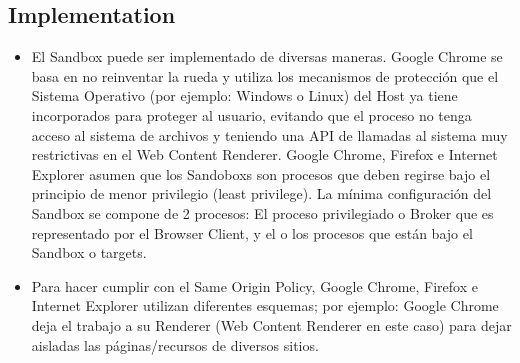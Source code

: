 \documentclass{sig-alternate-05-2015}
\begin{document}
  \subsection*{Implementation}
  \begin{itemize}
    \item El Sandbox puede ser implementado de diversas maneras. Google Chrome \cite{sandboxGC} se basa en no reinventar la rueda y utiliza los mecanismos de protección que el Sistema Operativo (por ejemplo: Windows o Linux) del Host ya tiene incorporados para proteger al usuario, evitando que el proceso no tenga acceso al sistema de archivos y teniendo una API de llamadas al sistema muy restrictivas en el Web Content Renderer. Google Chrome, Firefox e Internet Explorer asumen que los Sandoboxs son procesos que deben regirse bajo el principio de menor privilegio (least privilege). La mínima configuración del Sandbox se compone de 2 procesos: El proceso privilegiado o Broker que es representado por el Browser Client, y el o los procesos que están bajo el Sandbox o targets.
    \item Para hacer cumplir con el Same Origin Policy, Google Chrome, Firefox e Internet Explorer utilizan diferentes esquemas; por ejemplo: Google Chrome deja el trabajo a su Renderer (Web Content Renderer en este caso) para dejar aisladas las páginas/recursos de diversos sitios.
  \end{itemize}
\end{document}
